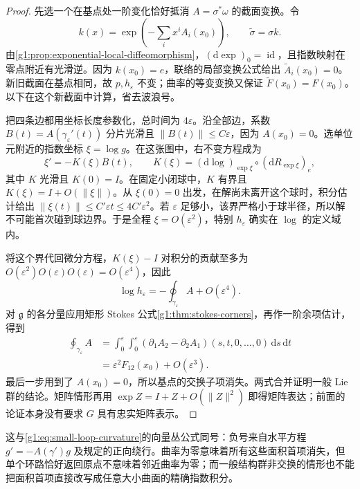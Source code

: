 \begin{proof}
	先选一个在基点处一阶变化恰好抵消 \(A=\sigma^*\omega\) 的截面变换。令
	\[
		k(x)=\exp\left(-\sum_i x^iA_i(x_0)\right),\qquad \widetilde\sigma=\sigma k.
	\]
	由\cref{g1:prop:exponential-local-diffeomorphism}，\((\mathrm{d}\exp)_0=\operatorname{id}\)，且指数映射在零点附近有光滑逆。因为 \(k(x_0)=e\)，联络的局部变换公式给出 \(\widetilde A_i(x_0)=0\)。新旧截面在基点相同，故 \(p,h_\varepsilon\) 不变；曲率的等变变换又保证 \(\widetilde F(x_0)=F(x_0)\)。以下在这个新截面中计算，省去波浪号。

	把四条边都用坐标长度参数化，总时间为 \(4\varepsilon\)。沿全部边，系数 \(B(t)=A(\gamma_\varepsilon'(t))\) 分片光滑且 \(\|B(t)\|\le C\varepsilon\)，因为 \(A(x_0)=0\)。选单位元附近的指数坐标 \(\xi=\log g\)。在这张图中，右不变方程成为
	\[
		\xi'=-K(\xi)B(t),\qquad
		K(\xi)=(\mathrm{d}\log)_{\exp\xi}\circ(\mathrm{d}R_{\exp\xi})_e,
	\]
	其中 \(K\) 光滑且 \(K(0)=I\)。在固定小闭球中，\(K\) 有界且 \(K(\xi)=I+O(\|\xi\|)\)。从 \(\xi(0)=0\) 出发，在解尚未离开这个球时，积分估计给出 \(\|\xi(t)\|\le C'\varepsilon t\le4C'\varepsilon^2\)。若 \(\varepsilon\) 足够小，该界严格小于球半径，所以解不可能首次碰到球边界。于是全程 \(\xi=O(\varepsilon^2)\)，特别 \(h_\varepsilon\) 确实在 \(\log\) 的定义域内。

	将这个界代回微分方程，\(K(\xi)-I\) 对积分的贡献至多为 \(O(\varepsilon^2)O(\varepsilon)O(\varepsilon)=O(\varepsilon^4)\)，因此
	\[
		\log h_\varepsilon=-\oint_{\gamma_\varepsilon}A+O(\varepsilon^4).
	\]
	对 \(\mathfrak g\) 的各分量应用矩形 Stokes 公式\cref{g1:thm:stokes-corners}，再作一阶余项估计，得到
	\begin{align*}
		\oint_{\gamma_\varepsilon}A
		&=\int_0^\varepsilon\int_0^\varepsilon(\partial_1A_2-\partial_2A_1)(s,t,0,\ldots,0)\,\mathrm{d}s\,\mathrm{d}t\\
		&=\varepsilon^2F_{12}(x_0)+O(\varepsilon^3).
	\end{align*}
	最后一步用到了 \(A(x_0)=0\)，所以基点的交换子项消失。两式合并证明一般 Lie 群的结论。矩阵情形再用 \(\exp Z=I+Z+O(\|Z\|^2)\) 即得矩阵表达；前面的论证本身没有要求 \(G\) 具有忠实矩阵表示。
\end{proof}

这与\eqref{g1:eq:small-loop-curvature}的向量丛公式同号：负号来自水平方程 \(g'=-A(\gamma')g\) 及规定的正向绕行。曲率为零意味着所有这些面积首项消失，但单个环路恰好返回原点不意味着邻近曲率为零；而一般结构群非交换的情形也不能把面积首项直接改写成任意大小曲面的精确指数积分。

